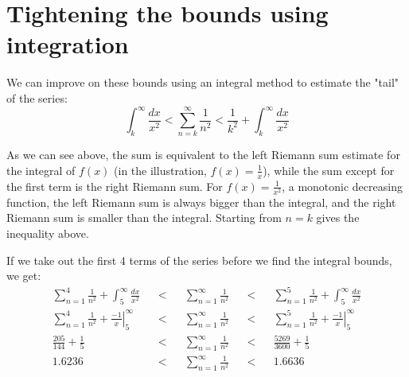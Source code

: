 \documentclass{article}
\begin{document}
\section{Tightening the bounds using integration}

We can improve on these bounds using an integral method to estimate the "tail" of the series:
\[ \int_k^{\infty} \frac{dx}{x^2} < \sum_{n=k}^{\infty} \frac{1}{n^2} < \frac{1}{k^2} +  \int_k^{\infty} \frac{dx}{x^2} \]


As we can see above, the sum is equivalent to the left Riemann sum estimate for the integral of $f(x)$ (in the illustration, $f(x) = \frac{1}{x}$), while the sum except for the first term is the right Riemann sum. For $f(x)=\frac{1}{x^2}$, a monotonic decreasing function, the left Riemann sum is always bigger than the integral, and the right Riemann sum is smaller than the integral. Starting from $n=k$ gives the inequality above.

If we take out the first 4 terms of the series before we find the integral bounds, we get:
\begin{align*}
    \sum_{n=1}^{4} \frac{1}{n^2} + \int_5^{\infty} \frac{dx}{x^2} &&<&& \sum_{n=1}^{\infty} \frac{1}{n^2} &&<&& \sum_{n=1}^{5} \frac{1}{n^2} + \int_5^{\infty} \frac{dx}{x^2} \\
    \sum_{n=1}^{4} \frac{1}{n^2} + \left. \frac{-1}{x} \right|_{5}^{\infty} &&<&& \sum_{n=1}^{\infty} \frac{1}{n^2} &&<&& \sum_{n=1}^{5} \frac{1}{n^2} + \left. \frac{-1}{x} \right|_{5}^{\infty} \\
    \frac{205}{144} + \frac{1}{5} &&<&& \sum_{n=1}^{\infty} \frac{1}{n^2} &&<&& \frac{5269}{3600} + \frac{1}{5} \\
    1.6236 &&<&& \sum_{n=1}^{\infty} \frac{1}{n^2} &&<&& 1.6636 \\
\end{align*} 
\end{document}
